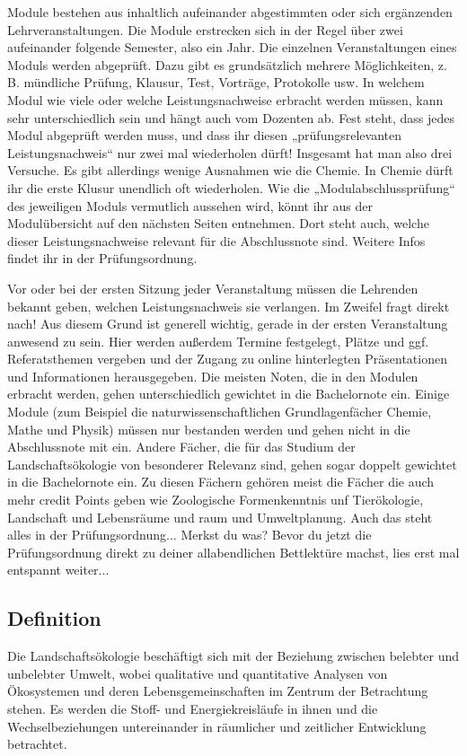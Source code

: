 Module bestehen aus inhaltlich aufeinander abgestimmten oder sich ergänzenden Lehrveranstaltungen. Die Module erstrecken sich in der Regel über zwei aufeinander folgende Semester, also ein Jahr. Die einzelnen Veranstaltungen eines Moduls werden abgeprüft. Dazu gibt es grundsätzlich mehrere Möglichkeiten, z. B. mündliche Prüfung, Klausur, Test, Vorträge, Protokolle usw. In welchem Modul wie viele oder welche Leistungsnachweise erbracht werden müssen, kann sehr unterschiedlich sein und hängt auch vom Dozenten ab. Fest steht, dass jedes Modul abgeprüft werden muss, und dass ihr diesen „prüfungsrelevanten Leistungsnachweis“ nur zwei mal wiederholen dürft! Insgesamt hat man also drei Versuche. Es gibt allerdings wenige Ausnahmen wie die Chemie. In Chemie dürft ihr die erste Klusur unendlich oft wiederholen. Wie die „Modulabschlussprüfung“ des jeweiligen Moduls vermutlich aussehen wird, könnt ihr aus der Modulübersicht auf den nächsten Seiten entnehmen. Dort steht auch, welche dieser Leistungsnachweise relevant für die Abschlussnote sind. Weitere Infos ﬁndet ihr in der Prüfungsordnung.

Vor oder bei der ersten Sitzung jeder Veranstaltung müssen die Lehrenden bekannt geben, welchen Leistungsnachweis sie verlangen. Im Zweifel fragt direkt nach! Aus diesem Grund ist generell wichtig, gerade in der ersten Veranstaltung anwesend zu sein. Hier werden außerdem Termine festgelegt, Plätze und ggf. Referatsthemen vergeben und der Zugang zu online hinterlegten Präsentationen und Informationen herausgegeben.
Die meisten Noten, die in den Modulen erbracht werden, gehen unterschiedlich gewichtet in die Bachelornote ein. Einige Module (zum Beispiel die naturwissenschaftlichen Grundlagenfächer Chemie, Mathe und Physik) müssen nur bestanden werden und gehen nicht in die Abschlussnote mit ein. Andere Fächer, die für das Studium der Landschaftsökologie von besonderer Relevanz sind, gehen sogar doppelt gewichtet in die Bachelornote ein. Zu diesen Fächern gehören meist die Fächer die auch mehr credit Points geben wie Zoologische Formenkenntnis unf Tierökologie, Landschaft und Lebensräume und raum und Umweltplanung. Auch das steht alles in der Prüfungsordnung... Merkst du was? Bevor du jetzt die Prüfungsordnung direkt zu deiner allabendlichen Bettlektüre machst, lies erst mal entspannt weiter...

\subsection*{Definition}
Die Landschaftsökologie beschäftigt sich mit der Beziehung zwischen belebter und unbelebter Umwelt, wobei qualitative und quantitative Analysen von Ökosystemen und deren Lebensgemeinschaften im Zentrum der Betrachtung stehen. Es werden die Stoff- und Energiekreisläufe in ihnen und die Wechselbeziehungen untereinander in räumlicher und zeitlicher Entwicklung betrachtet.

